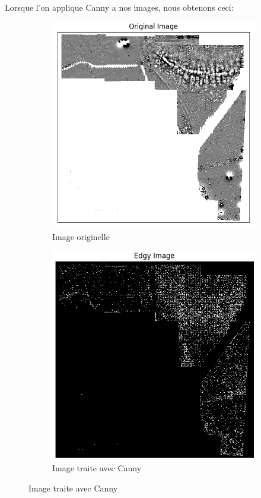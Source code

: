 \documentclass[a4paper, 12pt, titlepage, oneside]{article}
\begin{document}
			Lorsque l'on applique Canny a nos images, nous obtenons ceci:
	\begin{figure}[!h]
		\centering
		\begin{subfigure}[b]{0.4\linewidth}
			\includegraphics[width=\linewidth]{Canny1a.png}
			\caption{Image originelle}
		\end{subfigure}
		\begin{subfigure}[b]{0.4\linewidth}
			\includegraphics[width=\linewidth]{Canny1b.png}
			\caption{Image traite avec Canny}
		\end{subfigure}
		\label{fig:OurCanny}
	\end{figure}
	
\end{document}
